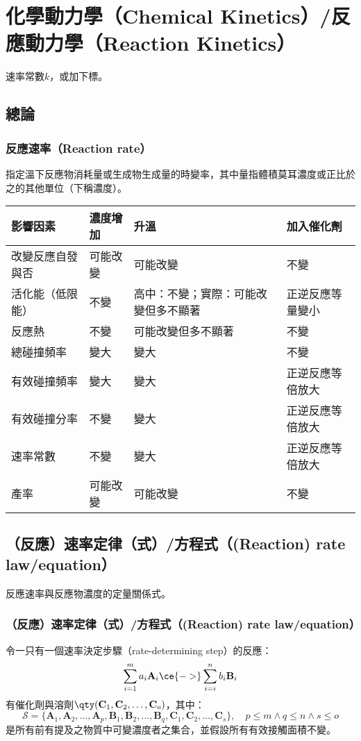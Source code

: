 \documentclass[a4paper,12pt]{report}
\begin{document}
\section{化學動力學（Chemical Kinetics）/反應動力學（Reaction Kinetics）}
速率常數$k$，或加下標。
\subsection{總論}
\subsubsection{反應速率（Reaction rate）}
指定溫下反應物消耗量或生成物生成量的時變率，其中量指體積莫耳濃度或正比於之的其他單位（下稱濃度）。
\begin{longtable}[c]{|p{}|p{}|p{}|p{}|}
\hline
影響因素 & 濃度增加 & 升溫 & 加入催化劑 \\ \hline
改變反應自發與否 & 可能改變 & 可能改變 & 不變 \\ \hline
活化能（低限能） & 不變 & 高中：不變；實際：可能改變但多不顯著 & 正逆反應等量變小 \\ \hline
反應熱 & 不變 & 可能改變但多不顯著 & 不變 \\ \hline
總碰撞頻率 & 變大 & 變大 & 不變 \\ \hline
有效碰撞頻率 & 變大 & 變大 & 正逆反應等倍放大 \\ \hline
有效碰撞分率 & 不變 & 變大 & 正逆反應等倍放大 \\ \hline
速率常數 & 不變 & 變大 & 正逆反應等倍放大 \\ \hline
產率 & 可能改變 & 可能改變 & 不變 \\ \hline
\end{longtable}\FB
\subsection{（反應）速率定律（式）/方程式（(Reaction) rate law/equation）}
反應速率與反應物濃度的定量關係式。
\subsubsection{（反應）速率定律（式）/方程式（(Reaction) rate law/equation）}
令一只有一個速率決定步驟（rate-determining step）的反應：
\[\sum_{i=1}^ma_i\mathbf{A}_i\ce{->}\sum_{i=i}^nb_i\mathbf{B}_i\]
有催化劑與溶劑$\qty(\mathbf{C}_1,\mathbf{C}_2,\ldots,\mathbf{C}_o)$，其中：
\[\mathscr{S}=\{\mathbf{A}_1,\mathbf{A}_2,\ldots,\mathbf{A}_p,\mathbf{B}_1,\mathbf{B}_2,\ldots,\mathbf{B}_q,\mathbf{C}_1,\mathbf{C}_2,\ldots,\mathbf{C}_s\},\quad p\leq m\land q\leq n\land s\leq o\]
是所有前有提及之物質中可變濃度者之集合，並假設所有有效接觸面積不變。
\end{document}
